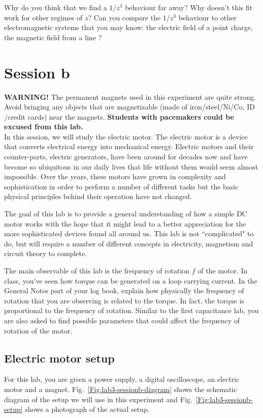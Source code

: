 \documentclass[12pt]{report}
\begin{document}
{\color{blue} Why do you think that we find a $1/z^3$ behaviour far away?
Why doesn't this fit work for other regimes of $z$?
Can you compare the $1/z^3$ behaviour to other electromagnetic systems that you may know: the electric field of a point charge, the magnetic field from a line
?}

\section{Session b}
\Large{\textbf{WARNING!}} \normalsize The permanent magnets used in this experiment are quite strong. Avoid bringing any objects that are magnetizable (made of iron/steel/Ni/Co, ID /credit cards)  near the magnets. \textbf{Students with pacemakers could be excused from this lab.} \\

In this session, we will study the electric motor. The electric motor is a device that converts electrical energy into mechanical energy. Electric motors and their counter-parts, electric generators, have been around for decades now and have become so ubiquitous in our daily lives that life without them would seem almost impossible. Over the years, these motors have grown in complexity and sophistication in order to perform a number of different tasks but the basic physical principles behind their operation have not changed.

The goal of this lab is to provide a general understanding of how a simple DC motor works with the hope that it might lead to a better appreciation for the more sophisticated devices found all around us. This lab is not ``complicated" to do, but will require a number of different concepts in electricity, magnetism and circuit theory to complete.

The main observable of this lab is the frequency of rotation $f$ of the motor.
In class, you've seen how torque can be generated on a loop carrying current. {\color{blue} In the General Notes part of your log book, explain how physically the frequency of rotation that you are observing is related to the torque.} In fact, the torque is proportional to the frequency of rotation.
Similar to the first capacitance lab, you are also asked to find possible parameters that could affect the frequency of rotation of the motor.

\subsection{Electric motor setup}
For this lab, you are given a power supply, a digital oscilloscope, an electric motor and a magnet. 
Fig.~\ref{Fig:lab3-sessionb-diagram} shows the schematic diagram of the setup we will use in this experiment and Fig.~\ref{Fig:lab3-sessionb-setup} shows a photograph of the actual setup. 
\end{document}
